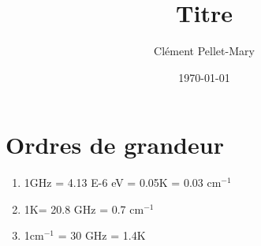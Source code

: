 \documentclass[a4paper]{article}
\title{Titre}
\author{Clément Pellet-Mary}
\date\today
\begin{document}
  \section{Ordres de grandeur}
  \begin{enumerate}
  \item 1GHz = 4.13 E-6 eV = 0.05K = 0.03 cm$^{-1}$
  \item 1K= 20.8 GHz = 0.7 cm$^{-1}$
  \item 1cm$^{-1}$ = 30 GHz = 1.4K
  \end{enumerate}

 
  
\end{document}
